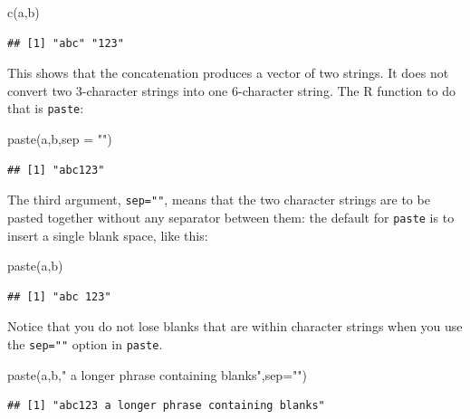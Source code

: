 \documentclass[
]{book}
\newenvironment{Shaded}{\begin{snugshade}}{\end{snugshade}}
\newcommand{\AttributeTok}[1]{\textcolor[rgb]{0.77,0.63,0.00}{#1}}
\newcommand{\FunctionTok}[1]{\textcolor[rgb]{0.00,0.00,0.00}{#1}}
\newcommand{\NormalTok}[1]{#1}
\newcommand{\StringTok}[1]{\textcolor[rgb]{0.31,0.60,0.02}{#1}}
\theoremstyle{definition}
\theoremstyle{definition}
\theoremstyle{definition}
\theoremstyle{definition}
\theoremstyle{remark}
\begin{document}
\begin{Shaded}
\begin{Highlighting}[]
\FunctionTok{c}\NormalTok{(a,b)}
\end{Highlighting}
\end{Shaded}

\begin{verbatim}
## [1] "abc" "123"
\end{verbatim}

This shows that the concatenation produces a vector of two strings. It does not convert two 3-character strings into one 6-character string. The R function to do that is \texttt{paste}:

\begin{Shaded}
\begin{Highlighting}[]
\FunctionTok{paste}\NormalTok{(a,b,}\AttributeTok{sep =} \StringTok{""}\NormalTok{)}
\end{Highlighting}
\end{Shaded}

\begin{verbatim}
## [1] "abc123"
\end{verbatim}

The third argument, \texttt{sep=""}, means that the two character strings are to be pasted together without any separator between them: the default for \texttt{paste} is to insert a single blank space, like this:

\begin{Shaded}
\begin{Highlighting}[]
\FunctionTok{paste}\NormalTok{(a,b)}
\end{Highlighting}
\end{Shaded}

\begin{verbatim}
## [1] "abc 123"
\end{verbatim}

Notice that you do not lose blanks that are within character strings when you use the \texttt{sep=""} option in
\texttt{paste}.

\begin{Shaded}
\begin{Highlighting}[]
\FunctionTok{paste}\NormalTok{(a,b,}\StringTok{" a longer phrase containing blanks"}\NormalTok{,}\AttributeTok{sep=}\StringTok{""}\NormalTok{)}
\end{Highlighting}
\end{Shaded}

\begin{verbatim}
## [1] "abc123 a longer phrase containing blanks"
\end{verbatim}
\end{document}
